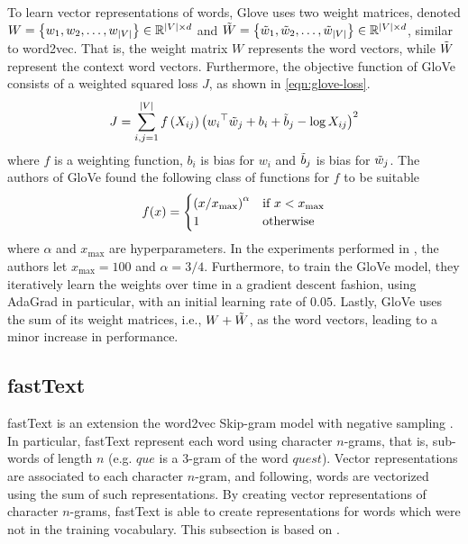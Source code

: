 To learn vector representations of words, Glove uses two weight matrices, denoted $W=\left\{w_1, w_2, \ldots, w_{|V|}\right\} \in \mathbb{R}^{|V| \times d}$ and $\Tilde{W}=\left\{\Tilde{w}_1, \Tilde{w}_2, \ldots, \Tilde{w}_{|V|}\right\} \in \mathbb{R}^{|V| \times d}$, similar to word2vec. That is, the weight matrix $W$ represents the word vectors, while $\Tilde{W}$ represent the context word vectors. Furthermore, the objective function of GloVe consists of a weighted squared loss $J$, as shown in \cref{eqn:glove-loss}.
\begin{align}
    J = \sum\limits_{i, j = 1}^{|V|} f \left(X_{ij}\right) \left({w_i}^\top \Tilde{w}_j + b_i + \Tilde{b}_j - \log X_{ij}\right)^2
    \label{eqn:glove-loss}
\end{align}
where $f$ is a weighting function, $b_i$ is bias for $w_i$ and $\Tilde{b}_j$ is bias for $\Tilde{w}_j$. The authors of GloVe found the following class of functions for $f$ to be suitable
\begin{align}
    f(x) = \begin{cases}
        \left(x / x_{\text{max}}\right)^\alpha & \mbox{if } x < x_{\text{max}} \\
        1 & \text{otherwise}
    \end{cases}
    \label{eqn:glove-loss-f-function}
\end{align}
where $\alpha$ and $x_{\text{max}}$ are hyperparameters. In the experiments performed in \cite{pennington2014glove}, the authors let $x_{\text{max}}=100$ and $\alpha=3/4$. Furthermore, to train the GloVe model, they iteratively learn the weights over time in a gradient descent fashion, using AdaGrad \cite{Duchi2011} in particular, with an initial learning rate of $0.05$. Lastly, GloVe uses the sum of its weight matrices, i.e., $W + \Tilde{W}$, as the word vectors, leading to a minor increase in performance.

\subsection{fastText}
fastText is an extension the word2vec Skip-gram model with negative sampling \cite{bojanowski2017enriching}. In particular, fastText represent each word using character $n$-grams, that is, sub-words of length $n$ (e.g. $\textit{que}$ is a $3$-gram of the word $\textit{quest}$). Vector representations are associated to each character $n$-gram, and following, words are vectorized using the sum of such representations. By creating vector representations of character $n$-grams, fastText is able to create representations for words which were not in the training vocabulary. This subsection is based on \cite{bojanowski2017enriching}.

